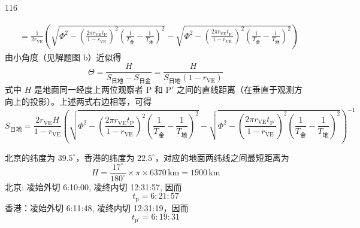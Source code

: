 \begin{solution}{116}
\begin{subsolution}
\begin{subsubsolution}
\begin{equation}
\begin{aligned}
                    &= \frac{1}{2 r_{\mathrm{VE}}} \left(\sqrt{\Phi^{2} - \left(\frac{2\pi r_{\mathrm{VE}} t_{\mathrm{P}}}{1 - r_{\mathrm{VE}}}\right)^{2} \left(\frac{1}{T_{\text{金}}} - \frac{1}{T_{\text{地}}}\right)^{2}} - \sqrt{\Phi^{2} - \left(\frac{2\pi r_{\mathrm{VE}} t_{\mathrm{P}^{\prime}}}{1 - r_{\mathrm{VE}}}\right)^{2} \left(\frac{1}{T_{\text{金}}} - \frac{1}{T_{\text{地}}}\right)^{2}}\right)
                \end{aligned}
            \end{equation}
            由小角度（见解题图 b）近似得
            \begin{equation}
                \Theta = \frac{H}{S_{\text{日地}} - S_{\text{日金}}} = \frac{H}{S_{\text{日地}} (1 - r_{\mathrm{VE}})}
            \end{equation}
            式中 $H$ 是地面同一经度上两位观察者 $\mathrm{P}$ 和 $\mathrm{P}'$ 之间的直线距离（在垂直于观测方向上的投影）。上述两式右边相等，可得
            \begin{equation}
                S_{\text{日地}} = \frac{2 r_{\mathrm{VE}} H}{1 - r_{\mathrm{VE}}} \left(\sqrt{\Phi^{2} - \left(\frac{2\pi r_{\mathrm{VE}} t_{\mathrm{P}}}{1 - r_{\mathrm{VE}}}\right)^{2} \left(\frac{1}{T_{\text{金}}} - \frac{1}{T_{\text{地}}}\right)^{2}} - \sqrt{\Phi^{2} - \left(\frac{2\pi r_{\mathrm{VE}} t_{\mathrm{P}^{\prime}}}{1 - r_{\mathrm{VE}}}\right)^{2} \left(\frac{1}{T_{\text{金}}} - \frac{1}{T_{\text{地}}}\right)^{2}}\right)^{-1}
                \label{eq:10.s116}
            \end{equation}
        \end{subsubsolution}
        \begin{subsubsolution}
            北京的纬度为 $39.5^{\circ}$，香港的纬度为 $22.5^{\circ}$，对应的地面两纬线之间最短距离为
            \begin{equation}
                H = \frac{17^{\circ}}{180^{\circ}} \times \pi \times 6370 \,\mathrm{km} = 1900 \,\mathrm{km}
                \label{eq:11.s116}
            \end{equation}
            北京: 凌始外切 6:10:00, 凌终内切 12:31:57, 因而
            \begin{equation}
                t_{\mathrm{p}} = 6:21:57
            \end{equation}
            香港：凌始外切 6:11:48, 凌终内切 12:31:19，因而
            \begin{equation}
                t_{\mathrm{p}^{\prime}} = 6:19:31
            \end{equation}

\end{subsubsolution}
\end{subsolution}
\end{solution}
